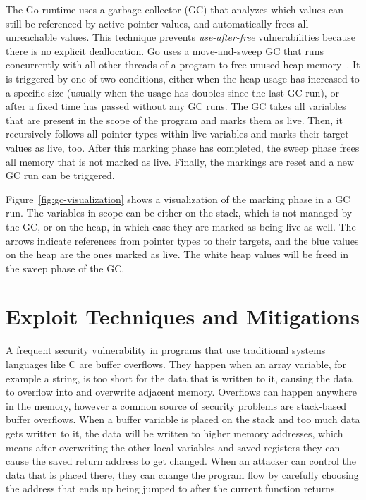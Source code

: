 The Go runtime uses a garbage collector (\acrshort{GC}) that analyzes which values can still be referenced by active
pointer values, and automatically frees all unreachable values.
This technique prevents \textit{use-after-free} vulnerabilities because there is no explicit deallocation.
Go uses a move-and-sweep GC that runs concurrently with all other threads of a program to free unused heap
memory~\cite{sibiryov2017}.
It is triggered by one of two conditions, either when the heap usage has increased to a specific size (usually when the
usage has doubles since the last \acrshort{GC} run), or after a fixed time has passed without any \acrshort{GC} runs.
The \acrshort{GC} takes all variables that are present in the scope of the program and marks them as live.
Then, it recursively follows all pointer types within live variables and marks their target values as live, too.
After this marking phase has completed, the sweep phase frees all memory that is not marked as live.
Finally, the markings are reset and a new \acrshort{GC} run can be triggered.

Figure~\ref{fig:gc-visualization} shows a visualization of the marking phase in a \acrshort{GC} run.
The variables in scope can be either on the stack, which is not managed by the \acrshort{GC}, or on the heap, in which
case they are marked as being live as well.
The arrows indicate references from pointer types to their targets, and the blue values on the heap are the ones marked
as live.
The white heap values will be freed in the sweep phase of the \acrshort{GC}.





\section{Exploit Techniques and Mitigations}\label{sec:background:exploit-techniques}

A frequent security vulnerability in programs that use traditional systems languages like C are buffer overflows.
They happen when an array variable, for example a string, is too short for the data that is written to it, causing the
data to overflow into and overwrite adjacent memory.
Overflows can happen anywhere in the memory, however a common source of security problems are stack-based buffer
overflows.
When a buffer variable is placed on the stack and too much data gets written to it, the data will be written to higher
memory addresses, which means after overwriting the other local variables and saved registers they can cause the saved
return address to get changed.
When an attacker can control the data that is placed there, they can change the program flow by carefully choosing the
address that ends up being jumped to after the current function returns.


